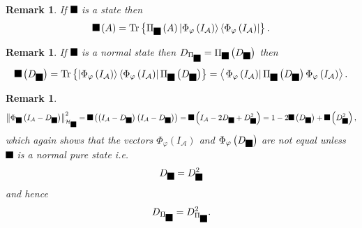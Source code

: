 \documentclass[aps,preprint]{revtex4}%
\providecommand{\U}[1]{\protect\rule{.1in}{.1in}}
\newtheorem{remark}[theorem]{Remark}
\begin{document}
\begin{remark}
If $\U{3c6} $ is a state then%
\begin{equation}
\U{3c6} \left(  A\right)  =\operatorname{Tr}\left\{  \Pi_{\U{3c6} }\left(
A\right)  \left\vert \Phi_{\varphi}\left(  I_{\mathcal{A}}\right)
\right\rangle \left\langle \Phi_{\varphi}\left(  I_{\mathcal{A}}\right)
\right\vert \right\}  .
\end{equation}

\end{remark}

\begin{remark}
If $\U{3c6} $ is a normal state then $D_{\Pi_{\U{3c6} }}=\Pi_{\U{3c6} }\left(
D_{\U{3c6} }\right)  $ then
\[
\U{3c6} \left(  D_{\U{3c6} }\right)  =\operatorname{Tr}\left\{  \left\vert
\Phi_{\varphi}\left(  I_{\mathcal{A}}\right)  \right\rangle \left\langle
\Phi_{\varphi}\left(  I_{\mathcal{A}}\right)  \right\vert \Pi_{\U{3c6}
}\left(  D_{\U{3c6} }\right)  \right\}  =\left\langle \left.  \Phi_{\varphi
}\left(  I_{\mathcal{A}}\right)  \right\vert \Pi_{\U{3c6} }\left(  D_{\U{3c6}
}\right)  \Phi_{\varphi}\left(  I_{\mathcal{A}}\right)  \right\rangle .
\]

\end{remark}

\begin{remark}%
\begin{equation}
\left\Vert \Phi_{\U{3c6} }\left(  I_{\mathcal{A}}-D_{\U{3c6} }\right)
\right\Vert _{\mathcal{H}_{\U{3c6} }}^{2}=\U{3c6} \left(  \left(
I_{\mathcal{A}}-D_{\U{3c6} }\right)  \left(  I_{\mathcal{A}}-D_{\U{3c6}
}\right)  \right)  =\U{3c6} \left(  I_{\mathcal{A}}-2D_{\U{3c6} }+D_{\U{3c6}
}^{2}\right)  =1-2\U{3c6} \left(  D_{\U{3c6} }\right)  +\U{3c6} \left(
D_{\U{3c6} }^{2}\right)  ,
\end{equation}
which again shows that the vectors $\Phi_{\varphi}\left(  I_{\mathcal{A}%
}\right)  $ and $\Phi_{\varphi}\left(  D_{\U{3c6} }\right)  $ are not equal
unless $\U{3c6} $ is a normal \emph{pure} state i.e.
\begin{equation}
D_{\U{3c6} }=D_{\U{3c6} }^{2}%
\end{equation}
and hence
\begin{equation}
D_{\Pi_{\U{3c6} }}=D_{\Pi_{\U{3c6} }}^{2}.
\end{equation}

\end{remark}
\end{document}
